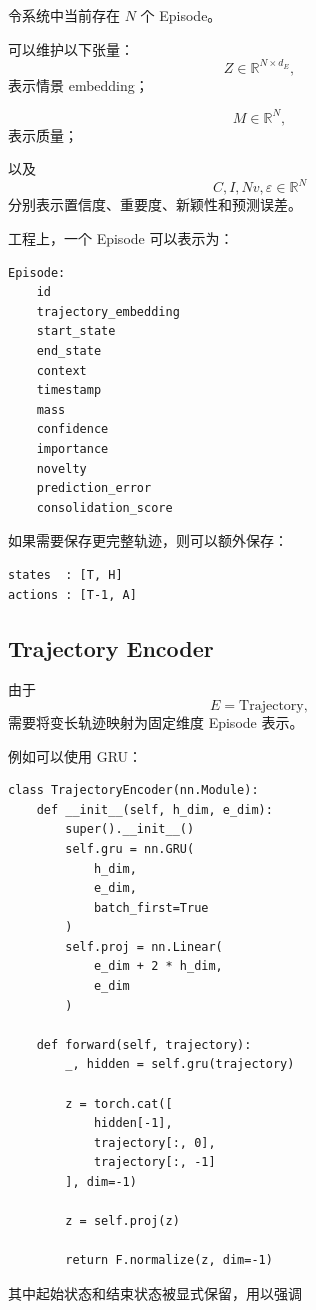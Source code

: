 令系统中当前存在 $N$ 个 Episode。

可以维护以下张量：
\[
Z
\in
\mathbb R^{N\times d_E},
\]
表示情景 embedding；

\[
M
\in
\mathbb R^N,
\]
表示质量；

以及
\[
C,I,Nv,\varepsilon
\in
\mathbb R^N
\]
分别表示置信度、重要度、新颖性和预测误差。

工程上，一个 Episode 可以表示为：

\begin{verbatim}
Episode:
    id
    trajectory_embedding
    start_state
    end_state
    context
    timestamp
    mass
    confidence
    importance
    novelty
    prediction_error
    consolidation_score
\end{verbatim}

如果需要保存更完整轨迹，则可以额外保存：

\begin{verbatim}
states  : [T, H]
actions : [T-1, A]
\end{verbatim}

\subsection{Trajectory Encoder}

由于
\[
E=\mathrm{Trajectory},
\]
需要将变长轨迹映射为固定维度 Episode 表示。

例如可以使用 GRU：

\begin{verbatim}
class TrajectoryEncoder(nn.Module):
    def __init__(self, h_dim, e_dim):
        super().__init__()
        self.gru = nn.GRU(
            h_dim,
            e_dim,
            batch_first=True
        )
        self.proj = nn.Linear(
            e_dim + 2 * h_dim,
            e_dim
        )

    def forward(self, trajectory):
        _, hidden = self.gru(trajectory)

        z = torch.cat([
            hidden[-1],
            trajectory[:, 0],
            trajectory[:, -1]
        ], dim=-1)

        z = self.proj(z)

        return F.normalize(z, dim=-1)
\end{verbatim}

其中起始状态和结束状态被显式保留，用以强调
\begin{statementbox}
\centering
{}
\end{statementbox}


